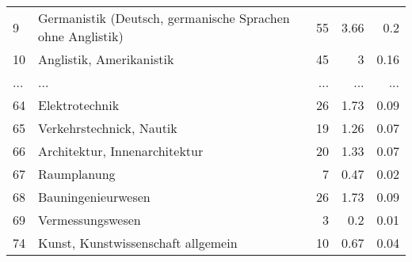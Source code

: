 \begin{longtable}{lXrrr}
        9 & \multicolumn{1}{X}{Germanistik (Deutsch, germanische Sprachen ohne Anglistik)} & %
          \num{55} &
          \num[round-mode=places,round-precision=2]{3,66} &
          \num[round-mode=places,round-precision=2]{0,2} \\
        10 & \multicolumn{1}{X}{Anglistik, Amerikanistik} & %
          \num{45} &
          \num[round-mode=places,round-precision=2]{3} &
          \num[round-mode=places,round-precision=2]{0,16} \\
       ... & ... & ... & ... & ... \\
        64 & \multicolumn{1}{X}{Elektrotechnik} & %
          \num{26} &
          \num[round-mode=places,round-precision=2]{1,73} &
          \num[round-mode=places,round-precision=2]{0,09} \\

        65 & \multicolumn{1}{X}{Verkehrstechnick, Nautik} & %
          \num{19} &
          \num[round-mode=places,round-precision=2]{1,26} &
          \num[round-mode=places,round-precision=2]{0,07} \\

        66 & \multicolumn{1}{X}{Architektur, Innenarchitektur} & %
          \num{20} &
          \num[round-mode=places,round-precision=2]{1,33} &
          \num[round-mode=places,round-precision=2]{0,07} \\

        67 & \multicolumn{1}{X}{Raumplanung} & %
          \num{7} &
          \num[round-mode=places,round-precision=2]{0,47} &
          \num[round-mode=places,round-precision=2]{0,02} \\

        68 & \multicolumn{1}{X}{Bauningenieurwesen} & %
          \num{26} &
          \num[round-mode=places,round-precision=2]{1,73} &
          \num[round-mode=places,round-precision=2]{0,09} \\

        69 & \multicolumn{1}{X}{Vermessungswesen} & %
          \num{3} &
          \num[round-mode=places,round-precision=2]{0,2} &
          \num[round-mode=places,round-precision=2]{0,01} \\

        74 & \multicolumn{1}{X}{Kunst, Kunstwissenschaft allgemein} & %
          \num{10} &
          \num[round-mode=places,round-precision=2]{0,67} &
          \num[round-mode=places,round-precision=2]{0,04} \\


\end{longtable}
